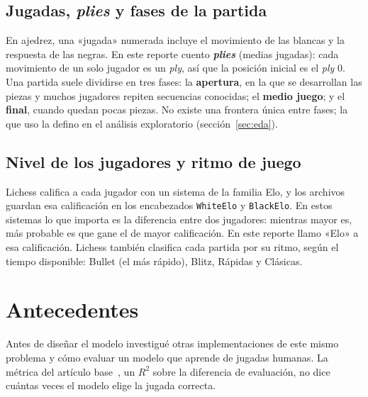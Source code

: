 \documentclass[a4paper,12pt,twocolumn]{article}
\begin{document}
\subsection{Jugadas, \textit{plies} y fases de la partida}

En ajedrez, una «jugada» numerada incluye el movimiento de las blancas y la respuesta de las negras. En este reporte cuento \textbf{\textit{plies}} (medias jugadas): cada movimiento de un solo jugador es un \textit{ply}, así que la posición inicial es el \textit{ply} 0.
\newline
Una partida suele dividirse en tres fases: la \textbf{apertura}, en la que se desarrollan las piezas y muchos jugadores repiten secuencias conocidas; el \textbf{medio juego}; y el \textbf{final}, cuando quedan pocas piezas. No existe una frontera única entre fases; la que uso la defino en el análisis exploratorio (sección~\ref{sec:eda}).

\subsection{Nivel de los jugadores y ritmo de juego}

Lichess califica a cada jugador con un sistema de la familia Elo, y los archivos guardan esa calificación en los encabezados \texttt{WhiteElo} y \texttt{BlackElo}. En estos sistemas lo que importa es la diferencia entre dos jugadores: mientras mayor es, más probable es que gane el de mayor calificación. En este reporte llamo «Elo» a esa calificación.
\newline
Lichess también clasifica cada partida por su ritmo, según el tiempo disponible: Bullet (el más rápido), Blitz, Rápidas y Clásicas.

\section{Antecedentes}

Antes de diseñar el modelo investigué otras implementaciones de este mismo problema y cómo evaluar un modelo que aprende de jugadas humanas. La métrica del artículo base~\cite{arsalan2024}, un $R^2$ sobre la diferencia de evaluación, no dice cuántas veces el modelo elige la jugada correcta.
\end{document}
